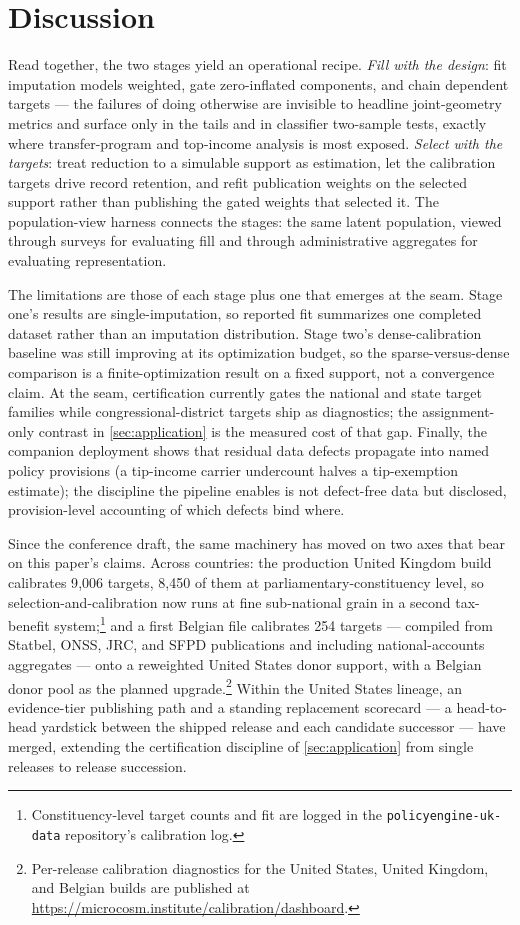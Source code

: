 \section{Discussion}
\label{sec:discussion}

Read together, the two stages yield an operational recipe.
\emph{Fill with the design}: fit imputation models weighted, gate
zero-inflated components, and chain dependent targets --- the
failures of doing otherwise are invisible to headline joint-geometry
metrics and surface only in the tails and in classifier two-sample
tests, exactly where transfer-program and top-income analysis is
most exposed. \emph{Select with the targets}: treat reduction to a
simulable support as estimation, let the calibration targets drive
record retention, and refit publication weights on the selected
support rather than publishing the gated weights that selected it.
The population-view harness connects the stages: the same latent
population, viewed through surveys for evaluating fill and through
administrative aggregates for evaluating representation.

The limitations are those of each stage plus one that emerges at
the seam. Stage one's results are single-imputation, so reported fit
summarizes one completed dataset rather than an imputation
distribution. Stage two's dense-calibration baseline was still
improving at its optimization budget, so the sparse-versus-dense
comparison is a finite-optimization result on a fixed support, not a
convergence claim. At the seam, certification currently gates the
national and state target families while congressional-district
targets ship as diagnostics; the assignment-only contrast in
\autoref{sec:application} is the measured cost of that gap. Finally,
the companion deployment shows that residual data defects propagate
into named policy provisions (a tip-income carrier undercount halves a
tip-exemption estimate); the discipline the pipeline enables is not
defect-free data but disclosed, provision-level accounting of which
defects bind where.

Since the conference draft, the same machinery has moved on two axes
that bear on this paper's claims. Across countries: the production
United Kingdom build calibrates 9{,}006 targets, 8{,}450 of them at
parliamentary-constituency level, so selection-and-calibration now
runs at fine sub-national grain in a second tax-benefit
system;\footnote{Constituency-level target counts and fit are logged
in the \texttt{policyengine-uk-data} repository's calibration log.}
and a first Belgian file calibrates 254 targets --- compiled from
Statbel, ONSS, JRC, and SFPD publications and including
national-accounts aggregates --- onto a reweighted United States
donor support, with a Belgian donor pool as the planned
upgrade.\footnote{Per-release calibration diagnostics for the United
States, United Kingdom, and Belgian builds are published at
\url{https://microcosm.institute/calibration/dashboard}.} Within the
United States lineage, an evidence-tier publishing path and a
standing replacement scorecard --- a head-to-head yardstick between
the shipped release and each candidate successor --- have merged,
extending the certification discipline of \autoref{sec:application}
from single releases to release succession.


